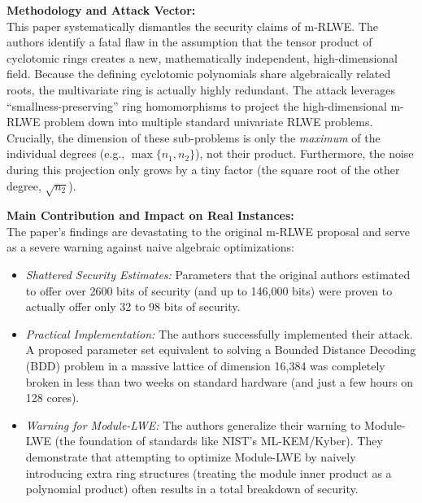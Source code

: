 \textbf{Methodology and Attack Vector:} \\
This paper systematically dismantles the security claims of m-RLWE. The authors identify a fatal flaw in the assumption that the tensor product of cyclotomic rings creates a new, mathematically independent, high-dimensional field. Because the defining cyclotomic polynomials share algebraically related roots, the multivariate ring is actually highly redundant. 
The attack leverages ``smallness-preserving'' ring homomorphisms to project the high-dimensional m-RLWE problem down into multiple standard univariate RLWE problems. Crucially, the dimension of these sub-problems is only the \textit{maximum} of the individual degrees (e.g., $\max\{n_1, n_2\}$), not their product. Furthermore, the noise during this projection only grows by a tiny factor (the square root of the other degree, $\sqrt{n_2}$).

\textbf{Main Contribution and Impact on Real Instances:} \\
The paper's findings are devastating to the original m-RLWE proposal and serve as a severe warning against naive algebraic optimizations:
\begin{itemize}
    \item \textit{Shattered Security Estimates:} Parameters that the original authors estimated to offer over 2600 bits of security (and up to 146,000 bits) were proven to actually offer only 32 to 98 bits of security.
    \item \textit{Practical Implementation:} The authors successfully implemented their attack. A proposed parameter set equivalent to solving a Bounded Distance Decoding (BDD) problem in a massive lattice of dimension 16,384 was completely broken in less than two weeks on standard hardware (and just a few hours on 128 cores).
    \item \textit{Warning for Module-LWE:} The authors generalize their warning to Module-LWE (the foundation of standards like NIST's ML-KEM/Kyber). They demonstrate that attempting to optimize Module-LWE by naively introducing extra ring structures (treating the module inner product as a polynomial product) often results in a total breakdown of security.
\end{itemize}
